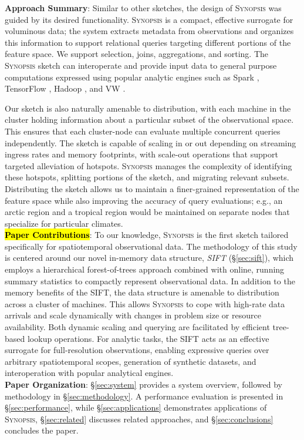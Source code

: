 %
\vspace{0.7em}
%
\textbf{Approach Summary}:
Similar to other sketches, the design of \textsc{Synopsis} was guided by its desired functionality. \textsc{Synopsis} is a compact, effective surrogate for voluminous data; the system extracts metadata from observations and organizes this information to support relational queries targeting different portions of the feature space. We support selection, joins, aggregations, and sorting. The \textsc{Synopsis} sketch can interoperate and provide input data to general purpose computations expressed using popular analytic engines such as Spark \cite{zaharia2010spark,armbrust2015spark}, TensorFlow \cite{abadi2016tensorflow,tensorflow}, Hadoop \cite{hadoop,shvachko2010hadoop,borthakur2008hdfs}, and VW \cite{langford2007vowpal}.

Our sketch is also naturally amenable to distribution, with each machine in the cluster holding information about a particular subset of the observational space.  This ensures that each cluster-node can evaluate multiple concurrent queries independently. The sketch is capable of scaling in or out depending on streaming ingress rates and memory footprints, with scale-out operations that support targeted alleviation of hotspots. \textsc{Synopsis} manages the complexity of identifying these hotspots, splitting portions of the sketch, and migrating relevant subsets. Distributing the sketch allows us to maintain a finer-grained representation of the feature space while also improving the accuracy of query evaluations; e.g., an arctic region and a tropical region would be maintained on separate nodes that specialize for particular climates.
%
\vspace{0.7em}\\
%
\textbf{\hl{Paper Contributions}}:
To our knowledge, \textsc{Synopsis} is the first sketch tailored specifically for spatiotemporal observational data. The methodology of this study is centered around our novel in-memory data structure, \emph{SIFT} (\S\ref{sec:sift}), which employs a hierarchical forest-of-trees approach combined with online, running summary statistics to compactly represent observational data. In addition to the memory benefits of the SIFT, the data structure is amenable to distribution across a cluster of machines. This allows \textsc{Synopsis} to cope with high-rate data arrivals and scale dynamically with changes in problem size or resource availability. Both dynamic scaling and querying are facilitated by efficient tree-based lookup operations. For analytic tasks, the SIFT acts as an effective surrogate for full-resolution observations, enabling expressive queries over arbitrary spatiotemporal scopes, generation of synthetic datasets, and interoperation with popular analytical engines.
%
\vspace{0.7em}\\
%
\textbf{Paper Organization}:
\S\ref{sec:system} provides a system overview, followed by methodology in \S\ref{sec:methodology}. A performance evaluation is presented in \S\ref{sec:performance}, while \S\ref{sec:applications} demonstrates applications of \textsc{Synopsis}, \S\ref{sec:related} discusses related approaches, and \S\ref{sec:conclusions} concludes the paper.
\vspace{-0.7em}

